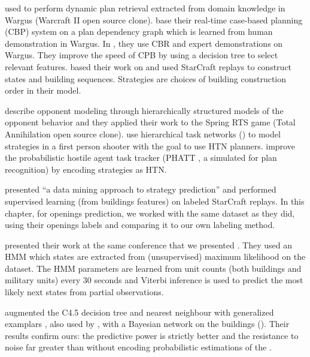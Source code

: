 \cite{LTW} used  to perform dynamic plan retrieval extracted from domain knowledge in Wargus (Warcraft II open source clone). \cite{CBR_Planning} base their real-time case-based planning (CBP) system on a plan dependency graph which is learned from human demonstration in Wargus. In \citep{OntanonCBR,PlanRetrieval}, they use CBR and expert demonstrations on Wargus. %
They improve the speed of CPB by using a decision tree to select relevant features. \cite{HsiehS08} based their work on \citep{LTW} and used StarCraft replays to construct states and building sequences. Strategies are choices of building construction order in their model. 

\cite{schadd2007opponent} describe opponent modeling through hierarchically structured models of the opponent behavior and they applied their work to the Spring RTS game (Total Annihilation open source clone). \cite{HTNPlanning} use hierarchical task networks () to model strategies in a first person shooter with the goal to use HTN planners. \cite{Kabanza2010} improve the probabilistic hostile agent task tracker (PHATT \citep{PHATT}, a simulated  for plan recognition) by encoding strategies as HTN. 

\cite{weberStrat} presented ``a data mining approach to strategy prediction'' and performed supervised learning (from buildings features) on labeled StarCraft replays. In this chapter, for openings prediction, we worked with the same dataset as they did, using their openings labels and comparing it to our own labeling method. %

\cite{HMMstrat_RTS_AIIDE11} presented their work at the same conference that we presented \citep{SYNNAEVE:StratPred}. They used an HMM which states are extracted from (unsupervised) maximum likelihood on the dataset. The HMM parameters are learned from unit counts (both buildings and military units) every 30 seconds and Viterbi inference is used to predict the most likely next states from partial observations. 

\cite{bjorn2012} augmented the C4.5 decision tree \citep{quinlan1993} and nearest neighbour with generalized examplars \citep{martin1995}, also used by \cite{weberStrat}, with a Bayesian network on the buildings (). Their results confirm ours: the predictive power is strictly better and the resistance to noise far greater than without encoding probabilistic estimations of the .



